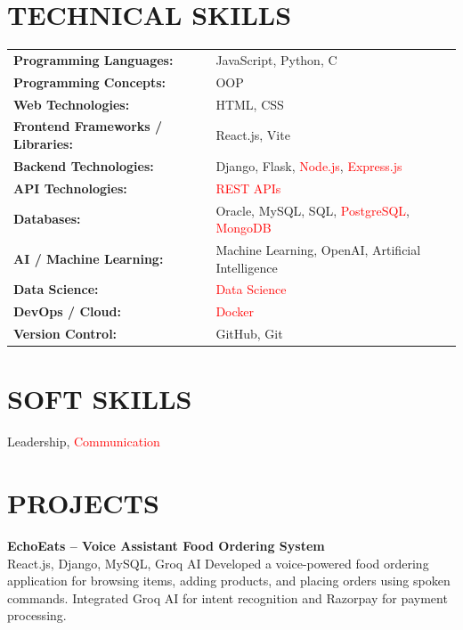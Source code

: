 \documentclass[9.5pt,a4paper]{extarticle}
\begin{document}
\section*{TECHNICAL SKILLS}
\begin{tabular}{@{}p{2.3in}p{4.6in}@{}}
\textbf{Programming Languages:} & JavaScript, Python, C \\
\textbf{Programming Concepts:} & OOP \\
\textbf{Web Technologies:} & HTML, CSS \\
\textbf{Frontend Frameworks / Libraries:} & React.js, Vite \\
\textbf{Backend Technologies:} & Django, Flask, \textcolor{red}{Node.js}, \textcolor{red}{Express.js} \\
\textbf{API Technologies:} & \textcolor{red}{REST APIs} \\
\textbf{Databases:} & Oracle, MySQL, SQL, \textcolor{red}{PostgreSQL}, \textcolor{red}{MongoDB} \\
\textbf{AI / Machine Learning:} & Machine Learning, OpenAI, Artificial Intelligence \\
\textbf{Data Science:} & \textcolor{red}{Data Science} \\
\textbf{DevOps / Cloud:} & \textcolor{red}{Docker} \\
\textbf{Version Control:} & GitHub, Git \\
\end{tabular}

\section*{SOFT SKILLS}
\noindent Leadership, \textcolor{red}{Communication} \vspace{4pt}



\section*{PROJECTS}
\noindent \textbf{EchoEats – Voice Assistant Food Ordering System} \\
React.js, Django, MySQL, Groq AI Developed a voice-powered food ordering application for browsing items, adding products, and placing orders using spoken commands. Integrated Groq AI for intent recognition and Razorpay for payment processing. \vspace{4pt}
\end{document}

